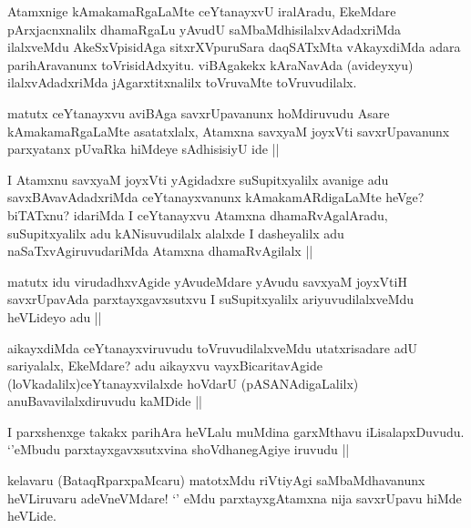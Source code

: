 Atamxnige kAmakamaRgaLaMte ceYtanayxvU iralAradu, EkeMdare pArxjacnxnalilx dhamaRgaLu yAvudU saMbaMdhisilalxvAdadxriMda ilalxveMdu AkeSxVpisidAga sitxrXVpuruSara daqSATxMta vAkayxdiMda adara parihAravanunx toVrisidAdxyitu. viBAgakekx kAraNavAda (avideyxyu) ilalxvAdadxriMda jAgarxtitxnalilx toVruvaMte toVruvudilalx.

\begin{artha}
matutx ceYtanayxvu aviBAga savxrUpavanunx hoMdiruvudu Asare kAmakamaRgaLaMte asatatxlalx, Atamxna savxyaM joyxVti savxrUpavanunx parxyatanx pUvaRka hiMdeye sAdhisisiyU ide ||
\end{artha}


\begin{artha}
I Atamxnu savxyaM joyxVti yAgidadxre suSupitxyalilx avanige adu savxBAvavAdadxriMda ceYtanayxvanunx kAmakamARdigaLaMte heVge? biTATxnu? idariMda I ceYtanayxvu Atamxna dhamaRvAgalAradu, suSupitxyalilx adu kANisuvudilalx alalxde I dasheyalilx adu naSaTxvAgiruvudariMda Atamxna dhamaRvAgilalx ||
\end{artha}

\begin{artha}
matutx idu virudadhxvAgide yAvudeMdare yAvudu savxyaM joyxVtiH savxrUpavAda parxtayxgavxsutxvu I suSupitxyalilx ariyuvudilalxveMdu heVLideyo adu ||
\end{artha}


\begin{artha}
aikayxdiMda ceYtanayxviruvudu toVruvudilalxveMdu utatxrisadare adU sariyalalx, EkeMdare? adu aikayxvu vayxBicaritavAgide (loVkadalilx)ceYtanayxvilalxde hoVdarU (pASANAdigaLalilx) anuBavavilalxdiruvudu kaMDide ||
\end{artha}



\begin{artha}
I parxshenxge takakx parihAra heVLalu muMdina garxMthavu iLisalapxDuvudu. `\stext'eMbudu parxtayxgavxsutxvina shoVdhanegAgiye iruvudu ||
\end{artha}


\begin{artha}
kelavaru (BataqRparxpaMcaru) matotxMdu riVtiyAgi saMbaMdhavanunx heVLiruvaru adeVneVMdare! `\stext' eMdu parxtayxgAtamxna nija savxrUpavu hiMde heVLide.
\end{artha}

